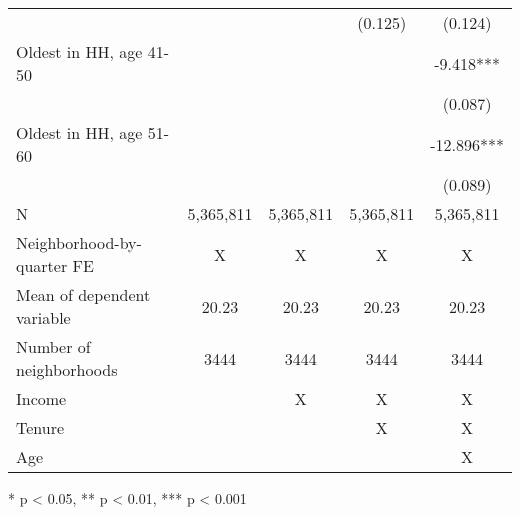 \begin{tabular}{lcccc}
 &  &  & (0.125) & (0.124) \\ 
Oldest in HH, age 41-50 &  &  &  & -9.418*** \\ 
 &  &  &  & (0.087) \\ 
Oldest in HH, age 51-60 &  &  &  & -12.896*** \\ 
 &  &  &  & (0.089) \\ 
N & 5,365,811 & 5,365,811 & 5,365,811 & 5,365,811 \\ 
Neighborhood-by-quarter FE & X & X & X & X \\ 
Mean of dependent variable & 20.23 & 20.23 & 20.23 & 20.23 \\ 
Number of neighborhoods & 3444 & 3444 & 3444 & 3444 \\ 
Income &  & X & X & X \\ 
Tenure &  &  & X & X \\ 
Age &  &  &  & X \\ 
\bottomrule
\end{tabular}
\begin{minipage}{\linewidth}
* p < 0.05, ** p < 0.01, *** p < 0.001\\
\end{minipage}